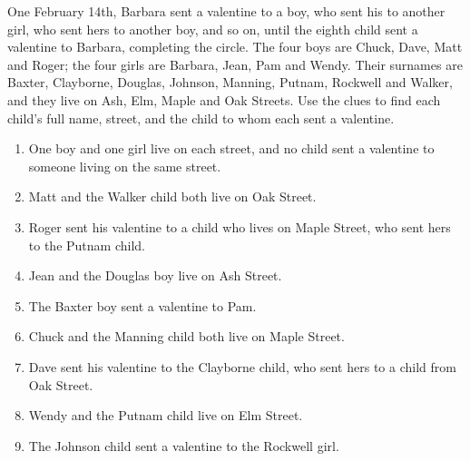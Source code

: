 One February 14th, Barbara sent a valentine to a boy, who sent his to another girl, who sent hers to another boy, and so on, until the eighth child sent a valentine to Barbara, completing the circle. The four boys are Chuck, Dave, Matt and Roger; the four girls are Barbara, Jean, Pam and Wendy. Their surnames are Baxter, Clayborne, Douglas, Johnson, Manning, Putnam, Rockwell and Walker, and they live on Ash, Elm, Maple and Oak Streets. Use the clues to find each child's full name, street, and the child to whom each sent a valentine.
\begin{enumerate}
\item One boy and one girl live on each street, and no child sent a valentine to someone living on the same street.
\item Matt and the Walker child both live on Oak Street.
\item Roger sent his valentine to a child who lives on Maple Street, who sent hers to the Putnam child.
\item Jean and the Douglas boy live on Ash Street.
\item The Baxter boy sent a valentine to Pam.
\item Chuck and the Manning child both live on Maple Street.
\item Dave sent his valentine to the Clayborne child, who sent hers to a child from Oak Street.
\item Wendy and the Putnam child live on Elm Street.
\item The Johnson child sent a valentine to the Rockwell girl.
\end{enumerate}

